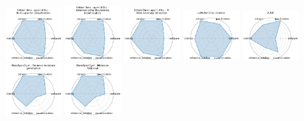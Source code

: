 \begin{figure}[ht!]
\centering
\includegraphics[width=0.1900\textwidth]{images/urban_data_layer_udl_-_built-up_area_classification_radar.pdf}
\includegraphics[width=0.1900\textwidth]{images/urban_data_layer_udl_-_administrative_boundaries_identification_radar.pdf}
\includegraphics[width=0.1900\textwidth]{images/urban_data_layer_udl_-_el_nino_anomaly_detection_radar.pdf}
\includegraphics[width=0.1900\textwidth]{images/llms_for_crop_science_radar.pdf}
\includegraphics[width=0.1900\textwidth]{images/dune_radar.pdf}
\\[1ex]
\includegraphics[width=0.1900\textwidth]{images/massspecgym_-_de_novo_molecule_generation_radar.pdf}
\includegraphics[width=0.1900\textwidth]{images/massspecgym_-_molecule_retrieval_radar.pdf}

\end{figure}

